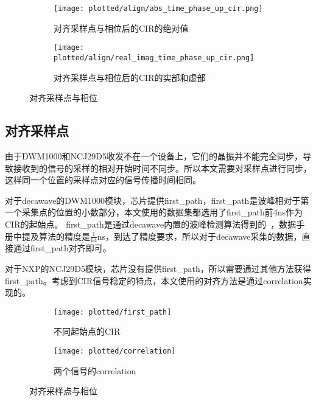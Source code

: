 \begin{figure}[htbp]
    \begin{subfigure}{0.47\textwidth}
        \centering
        \texttt{[image: plotted/align/abs\_time\_phase\_up\_cir.png]}
        \caption{\label{fig:abs_time_phase_up_cir}对齐采样点与相位后的CIR的绝对值}
    \end{subfigure}
    \begin{subfigure}{0.47\textwidth}
        \centering
        \texttt{[image: plotted/align/real\_imag\_time\_phase\_up\_cir.png]}
        \caption{\label{fig:real_imag_time_phase_up_cir}对齐采样点与相位后的CIR的实部和虚部}
    \end{subfigure}
    \caption{对齐采样点与相位}
    \label{fig:align}
\end{figure}

\subsection{对齐采样点}
由于DWM1000和NCJ29D5收发不在一个设备上，它们的晶振并不能完全同步，导致接收到的信号的采样的相对开始时间不同步。所以本文需要对采样点进行同步，这样同一个位置的采样点对应的信号传播时间相同。

对于decawave的DWM1000模块，芯片提供first\_path，first\_path是波峰相对于第一个采集点的位置的小数部分，本文使用的数据集都选用了first\_path前4ns作为CIR的起始点。
first\_path是通过decawave内置的波峰检测算法得到的~\cite{dwm1000_user_manual}，数据手册中提及算法的精度是\(\frac{1}{64}\)ns，到达了精度要求，所以对于decawave采集的数据，直接通过first\_path对齐即可。

对于NXP的NCJ29D5模块，芯片没有提供first\_path，所以需要通过其他方法获得first\_path。考虑到CIR信号稳定的特点，本文使用的对齐方法是通过correlation实现的。

\begin{figure}[htbp]
    \centering
    \begin{subfigure}{0.9\textwidth}
        \centering
        \texttt{[image: plotted/first\_path]}
        \caption{\label{fig:first_path}不同起始点的CIR}
    \end{subfigure}%

    \centering
    \begin{subfigure}{0.9\textwidth}
        \centering
        \texttt{[image: plotted/correlation]}
        \caption{\label{fig:correlation}两个信号的correlation}
    \end{subfigure}%

    \caption{对齐采样点与相位}
    \label{fig:first_path_and_correlation}
\end{figure}
